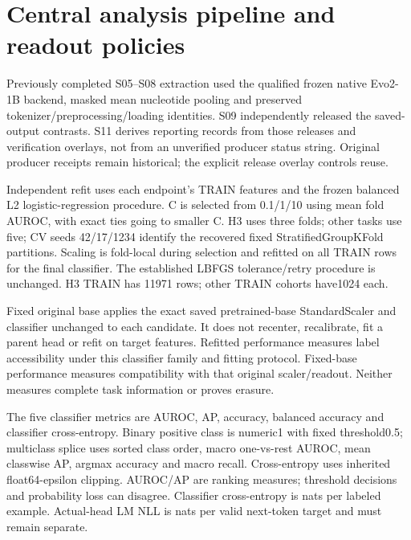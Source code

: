 \documentclass[11pt]{article}
\begin{document}
\section{Central analysis pipeline and readout policies}
Previously completed S05--S08 extraction used the qualified frozen native Evo2-1B backend, masked mean nucleotide pooling and preserved tokenizer/preprocessing/loading identities. S09 independently released the saved-output contrasts. S11 derives reporting records from those releases and verification overlays, not from an unverified producer status string. Original producer receipts remain historical; the explicit release overlay controls reuse.\par
Independent refit uses each endpoint's TRAIN features and the frozen balanced L2 logistic-regression procedure. C is selected from 0.1/1/10 using mean fold AUROC, with exact ties going to smaller C. H3 uses three folds; other tasks use five; CV seeds 42/17/1234 identify the recovered fixed StratifiedGroupKFold partitions. Scaling is fold-local during selection and refitted on all TRAIN rows for the final classifier. The established LBFGS tolerance/retry procedure is unchanged. H3 TRAIN has 11971 rows; other TRAIN cohorts have1024 each.\par
Fixed original base applies the exact saved pretrained-base StandardScaler and classifier unchanged to each candidate. It does not recenter, recalibrate, fit a parent head or refit on target features. Refitted performance measures label accessibility under this classifier family and fitting protocol. Fixed-base performance measures compatibility with that original scaler/readout. Neither measures complete task information or proves erasure.\par
The five classifier metrics are AUROC, AP, accuracy, balanced accuracy and classifier cross-entropy. Binary positive class is numeric1 with fixed threshold0.5; multiclass splice uses sorted class order, macro one-vs-rest AUROC, mean classwise AP, argmax accuracy and macro recall. Cross-entropy uses inherited float64-epsilon clipping. AUROC/AP are ranking measures; threshold decisions and probability loss can disagree. Classifier cross-entropy is nats per labeled example. Actual-head LM NLL is nats per valid next-token target and must remain separate.\par
\end{document}

